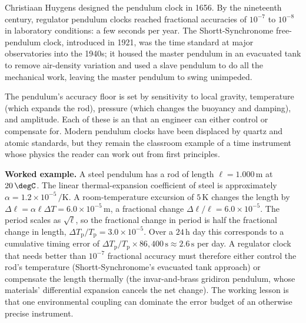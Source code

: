 Christiaan Huygens designed the pendulum clock in 1656. By the
nineteenth century, regulator pendulum clocks reached fractional
accuracies of $10^{-7}$ to $10^{-8}$ in laboratory conditions: a few
seconds per year. The Shortt-Synchronome free-pendulum clock,
introduced in 1921, was the time standard at major observatories
into the 1940s; it housed the master pendulum in an evacuated tank
to remove air-density variation and used a slave pendulum to do all
the mechanical work, leaving the master pendulum to swing
unimpeded.

The pendulum's accuracy floor is set by sensitivity to local
gravity, temperature (which expands the rod), pressure (which
changes the buoyancy and damping), and amplitude. Each of these is
an  that an engineer can either
control or compensate for. Modern pendulum clocks have been
displaced by quartz and atomic standards, but they remain the
classroom example of a time instrument whose physics the reader can
work out from first principles.

\textbf{Worked example.} A steel pendulum has a rod of length $\ell
= 1.000 \,\si{\meter}$ at $20 \,\degC$. The linear thermal-expansion
coefficient of steel is approximately $\alpha = 1.2 \times 10^{-5}
\,\si{\per\kelvin}$. A room-temperature excursion of $5 \,\si
{\kelvin}$ changes the length by $\Delta \ell = \alpha \ell \Delta
T = 6.0 \times 10^{-5} \,\si{\meter}$, a fractional change $\Delta
\ell / \ell = 6.0 \times 10^{-5}$. The period scales as $\sqrt
{\ell}$, so the fractional change in period is half the fractional
change in length, $\Delta T_{\text{p}}/T_{\text{p}} = 3.0 \times
10^{-5}$. Over a $24 \,\si{\hour}$ day this corresponds to a
cumulative timing error of $\Delta T_{\text{p}}/T_{\text{p}} \times
86{,}400 \,\si{\second} \approx 2.6 \,\si{\second}$ per day. A
regulator clock that needs better than $10^{-7}$ fractional
accuracy must therefore either control the rod's temperature
(Shortt-Synchronome's evacuated tank approach) or compensate the
length thermally (the invar-and-brass gridiron pendulum, whose
materials' differential expansion cancels the net change). The
working lesson is that one environmental coupling can dominate the
error budget of an otherwise precise instrument.

